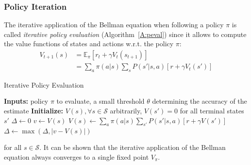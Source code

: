 \subsubsection{Policy Iteration}
The iterative application of the Bellman equation when following a policy $\pi$ is called \textit{iterative policy evaluation} (Algorithm~\ref{A:peval}) since it allows to compute the value functions of states and actions w.r.t. the policy $\pi$:
\begin{align}
 V_{t+1} (s) &= \mathbb{E}_\pi[r_t + \gamma V_t(s_{t+1})]\nonumber\\
             &= \sum_a \pi(a|s) \sum_s P(s' | s, a)[r + \gamma V_t(s')]
\end{align}
\begin{algorithm}[t]
 \caption{Iterative Policy Evaluation}
 \begin{algorithmic}[1]\label{A:peval}
  \STATE \textbf{Inputs:} policy $\pi$ to evaluate, a small threshold $\theta$ determining the accuracy of the estimate
  \STATE \textbf{Initialize:} $V(s), \forall s \in \mathcal{S}$ arbitrarily, $V(s') = 0$ for all terminal states $s'$
  \REPEAT
  \STATE $\Delta \leftarrow 0$
  \STATE $v \leftarrow V(s)$
  \STATE $V(s) \leftarrow \sum_a \pi(a|s) \sum_{s'} P(s'|s,a)[r + \gamma V(s')]$
  \STATE $\Delta \leftarrow \max(\Delta, |v - V(s)|)$
  \ENDFOR
  \UNTIL{$\Delta < \theta$}
 \end{algorithmic}
\end{algorithm}
for all $s \in \mathcal{S}$. It can be shown that the iterative application of the Bellman equation always converges to a single fixed point $V_\pi$.

